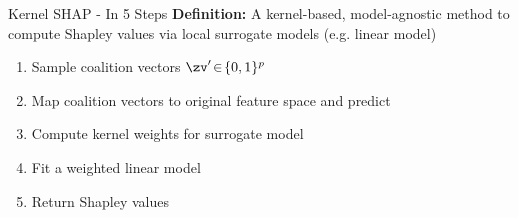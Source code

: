 \documentclass[10pt,compress,t,notes=noshow, xcolor=table]{beamer}
\begin{document}
\begin{framev}[align=top]{Kernel SHAP - In 5 Steps}
\textbf{Definition:} A kernel-based, model-agnostic method to compute Shapley values via local surrogate models (e.g. linear model)\\
\spacer[0.25]
\begin{enumerate}
\item Sample coalition vectors \(\zv'\!\in\!\{0,1\}^p\)
\item Map coalition vectors to original feature space and predict
\item Compute kernel weights for surrogate model
\item Fit a weighted linear model
\item Return Shapley values
\end{enumerate}
\end{framev}
\end{document}
